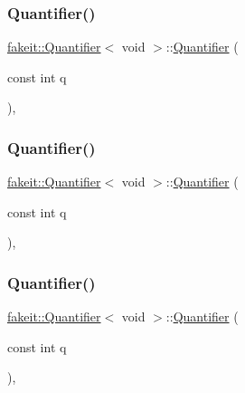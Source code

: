 \subsubsection{\texorpdfstring{Quantifier()}{Quantifier()}\hspace{0.1cm}{\footnotesize\ttfamily [1/9]}}
{\footnotesize\ttfamily \mbox{\hyperlink{structfakeit_1_1Quantifier}{fakeit\+::\+Quantifier}}$<$ void $>$\+::\mbox{\hyperlink{structfakeit_1_1Quantifier}{Quantifier}} (\begin{DoxyParamCaption}\item[{const int}]{q }\end{DoxyParamCaption})\hspace{0.3cm}{\ttfamily [inline]}, {\ttfamily [explicit]}}

\mbox{\label{structfakeit_1_1Quantifier_3_01void_01_4_aa43b73adf29aa234b3c15b66c9e985c0}} 
\subsubsection{\texorpdfstring{Quantifier()}{Quantifier()}\hspace{0.1cm}{\footnotesize\ttfamily [2/9]}}
{\footnotesize\ttfamily \mbox{\hyperlink{structfakeit_1_1Quantifier}{fakeit\+::\+Quantifier}}$<$ void $>$\+::\mbox{\hyperlink{structfakeit_1_1Quantifier}{Quantifier}} (\begin{DoxyParamCaption}\item[{const int}]{q }\end{DoxyParamCaption})\hspace{0.3cm}{\ttfamily [inline]}, {\ttfamily [explicit]}}

\mbox{\label{structfakeit_1_1Quantifier_3_01void_01_4_aa43b73adf29aa234b3c15b66c9e985c0}} 
\subsubsection{\texorpdfstring{Quantifier()}{Quantifier()}\hspace{0.1cm}{\footnotesize\ttfamily [3/9]}}
{\footnotesize\ttfamily \mbox{\hyperlink{structfakeit_1_1Quantifier}{fakeit\+::\+Quantifier}}$<$ void $>$\+::\mbox{\hyperlink{structfakeit_1_1Quantifier}{Quantifier}} (\begin{DoxyParamCaption}\item[{const int}]{q }\end{DoxyParamCaption})\hspace{0.3cm}{\ttfamily [inline]}, {\ttfamily [explicit]}}

